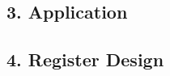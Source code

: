 \documentclass[letterpaper,10pt,english]{sphinxmanual}
\begin{document}
\subsection{3. Application}
\label{\detokenize{STM32_u5b9a_u65f6_u5668_u8bbe_u8ba1_u4ecb_u7ecd/STM32_u7684_u5b9a_u65f6_u5668_u8bbe_u8ba1_u4ecb_u7ecd:id8}}

\subsection{4. Register Design}
\label{\detokenize{STM32_u5b9a_u65f6_u5668_u8bbe_u8ba1_u4ecb_u7ecd/STM32_u7684_u5b9a_u65f6_u5668_u8bbe_u8ba1_u4ecb_u7ecd:id9}}


\renewcommand{\indexname}{索引}
\printindex
\end{document}
